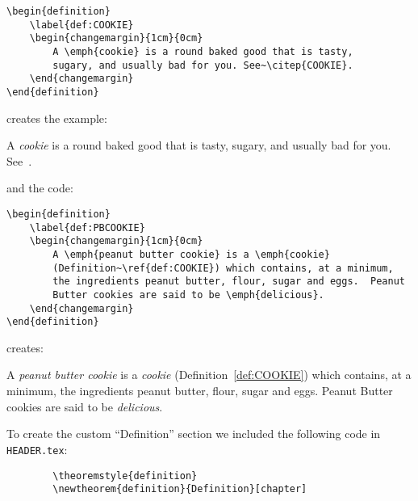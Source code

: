 \begin{verbatim}
\begin{definition}
    \label{def:COOKIE}
    \begin{changemargin}{1cm}{0cm}      
        A \emph{cookie} is a round baked good that is tasty,
        sugary, and usually bad for you. See~\citep{COOKIE}.
    \end{changemargin}
\end{definition}
\end{verbatim}

\noindent creates the example:

\begin{definition}
    \label{def:COOKIE}
    \begin{changemargin}{1cm}{0cm}      
    A \emph{cookie} is a round baked good that is tasty,
    sugary, and usually bad for you. See~\citep{COOKIE}.
    \end{changemargin}
\end{definition}

\noindent and the code:

\begin{verbatim}
\begin{definition}
    \label{def:PBCOOKIE}
    \begin{changemargin}{1cm}{0cm}      
        A \emph{peanut butter cookie} is a \emph{cookie}
        (Definition~\ref{def:COOKIE}) which contains, at a minimum,
        the ingredients peanut butter, flour, sugar and eggs.  Peanut
        Butter cookies are said to be \emph{delicious}.
    \end{changemargin}
\end{definition}
\end{verbatim}

\noindent creates:

\begin{definition}
    \label{def:PBCOOKIE}
    \begin{changemargin}{1cm}{0cm}      
        A \emph{peanut butter cookie} is a \emph{cookie}
        (Definition~\ref{def:COOKIE}) which contains, at a minimum,
        the ingredients peanut butter, flour, sugar and eggs.  Peanut
        Butter cookies are said to be \emph{delicious}.
    \end{changemargin}
\end{definition}

To create the custom ``Definition'' section we included the 
following code in \verb|HEADER.tex|:

\begin{verbatim}
        \theoremstyle{definition}
        \newtheorem{definition}{Definition}[chapter]
\end{verbatim}

